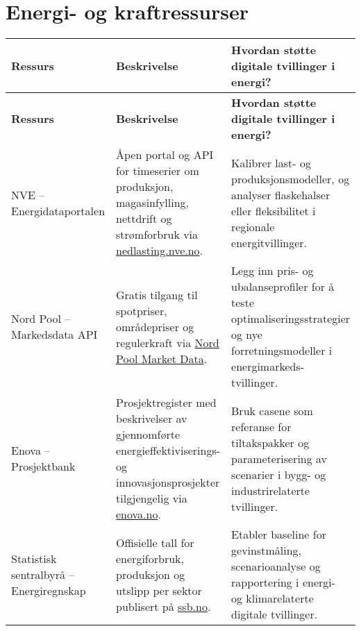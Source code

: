 \section{Energi- og kraftressurser}
\begin{longtable}{p{}p{}p{}}
\toprule
\textbf{Ressurs} & \textbf{Beskrivelse} & \textbf{Hvordan støtte digitale tvillinger i energi?} \\
\midrule
\endfirsthead
\toprule
\textbf{Ressurs} & \textbf{Beskrivelse} & \textbf{Hvordan støtte digitale tvillinger i energi?} \\
\midrule
\endhead
NVE – Energidataportalen & Åpen portal og API for timeserier om produksjon, magasinfylling, nettdrift og strømforbruk via \href{https://nedlasting.nve.no/}{nedlasting.nve.no}. & Kalibrer last- og produksjonsmodeller, og analyser flaskehalser eller fleksibilitet i regionale energitvillinger. \\
\addlinespace
Nord Pool – Markedsdata API & Gratis tilgang til spotpriser, områdepriser og regulerkraft via \href{https://www.nordpoolgroup.com/en/Market-data1/}{Nord Pool Market Data}. & Legg inn pris- og ubalanseprofiler for å teste optimaliseringsstrategier og nye forretningsmodeller i energimarkeds-tvillinger. \\
\addlinespace
Enova – Prosjektbank & Prosjektregister med beskrivelser av gjennomførte energieffektiviserings- og innovasjonsprosjekter tilgjengelig via \href{https://www.enova.no/bedrift/prosjekter/prosjektbank/}{enova.no}. & Bruk casene som referanse for tiltakspakker og parameterisering av scenarier i bygg- og industrirelaterte tvillinger. \\
\addlinespace
Statistisk sentralbyrå – Energiregnskap & Offisielle tall for energiforbruk, produksjon og utslipp per sektor publisert på \href{https://www.ssb.no/energi-og-industri/energi/statistikk/energiregnskap}{ssb.no}. & Etabler baseline for gevinstmåling, scenarioanalyse og rapportering i energi- og klimarelaterte digitale tvillinger. \\
\bottomrule
\end{longtable}

